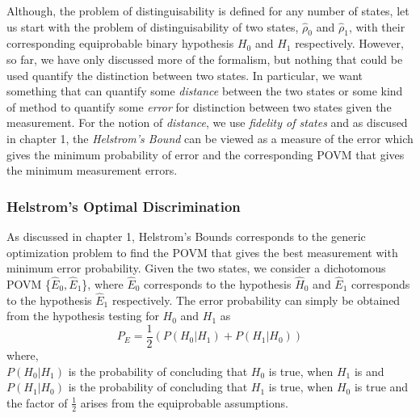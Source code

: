 Although, the problem of distinguisability is defined for any number of states, let us start with the problem of distinguisability of two states, $\hat{\rho}_0$ and $\hat{\rho}_1$, with their corresponding equiprobable binary hypothesis $H_0$ and $H_1$ respectively. However, so far, we have only discussed more of the formalism, but nothing that could be used quantify the distinction between two states. In particular, we want something that can quantify some \textit{distance} between the two states or some kind of method to quantify some \textit{error} for distinction between two states given the measurement. For the notion of \textit{distance}, we use \textit{fidelity of states} and as discused in chapter 1, the \textit{Helstrom's Bound} can be viewed as a measure of the error which gives the minimum probability of error and the corresponding POVM that gives the minimum measurement errors.

\subsubsection{Helstrom’s Optimal Discrimination}
As discussed in chapter 1, Helstrom's Bounds corresponds to the generic optimization problem to find the POVM that gives the best measurement with minimum error probability. Given the two states, we consider a dichotomous POVM \{$\hat{E}_0, \hat{E}_1$\}, where $\hat{E}_0$ corresponds to the hypothesis $\hat{H}_0$ and $\hat{E}_1$ corresponds to the hypothesis $\hat{E}_1$ respectively.
The error probability can simply be obtained from the hypothesis testing for $H_0$ and $H_1$ as 
\begin{equation}
    P_E = \frac{1}{2} (P(H_0|H_1) + P(H_1|H_0))
    \label{eq:311a}
\end{equation}
where,\\
$P(H_0|H_1)$ is the probability of concluding that $H_0$ is true, when $H_1$ is and\\
$P(H_1|H_0)$ is the probability of concluding that $H_1$ is true, when $H_0$ is true and\\
the factor of $\frac{1}{2}$ arises from the equiprobable assumptions.

